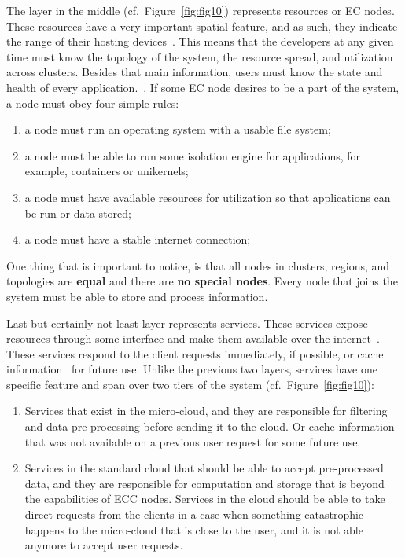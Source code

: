 The layer in the middle (cf.~Figure~\ref{fig:fig10}) represents resources or EC nodes. These resources have a very important spatial feature, and as such, they indicate the range of their hosting devices~\cite{JinCJL14}. This means that the developers at any given time must know the topology of the system, the resource spread, and utilization across clusters. Besides that main information, users must know the state and health of every application.~\label{soc:resources}. If some EC node desires to be a part of the system, a node must obey four simple rules:

\begin{enumerate}[start=1,label={(\bfseries \arabic*)}]
\item a node must run an operating system with a usable file system;
\item a node must be able to run some isolation engine for applications, for example, containers or unikernels;
\item a node must have available resources for utilization so that applications can be run or data stored;
\item a node must have a stable internet connection;
\end{enumerate}

\noindent
One thing that is important to notice, is that all nodes in clusters, regions, and topologies are \textbf{equal} and there are \textbf{no special nodes}. Every node that joins the system must be able to store and process information.

Last but certainly not least layer represents services. These services expose resources through some interface and make them available over the internet~\cite{JinCJL14}. These services respond to the client requests immediately, if possible, or cache information~\cite{SatyanarayananBCD09,YaoXWYZP20} for future use. Unlike the previous two layers, services have one specific feature and span over two tiers of the system (cf.~Figure~\ref{fig:fig10}):

\begin{enumerate}[start=1,label={(\bfseries \roman*)}]\label{services}
	\item Services that exist in the micro-cloud, and they are responsible for filtering and data pre-processing before sending it to the cloud. Or cache information that was not available on a previous user request for some future use.
	\item Services in the standard cloud that should be able to accept pre-processed data, and they are responsible for computation and storage that is beyond the capabilities of ECC nodes. Services in the cloud should be able to take direct requests from the clients in a case when something catastrophic happens to the micro-cloud that is close to the user, and it is not able anymore to accept user requests.
\end{enumerate}

